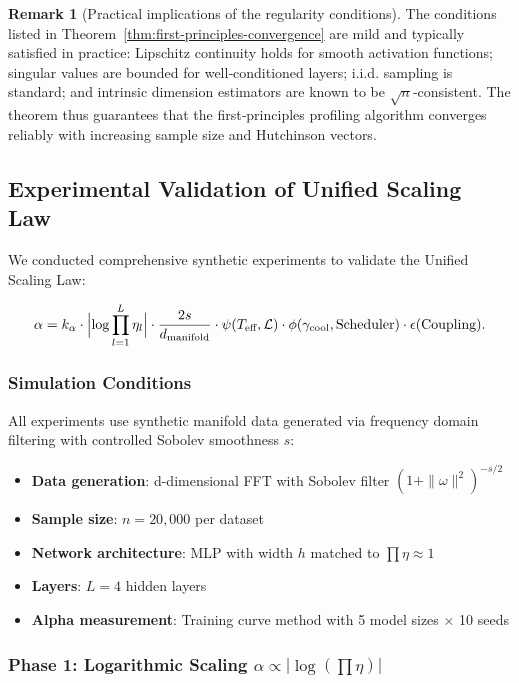 \documentclass[11pt, a4paper]{article}
\theoremstyle{definition}
\newtheorem{remark}{Remark}[section]
\begin{document}
\begin{remark}[Practical implications of the regularity conditions]
The conditions listed in Theorem~\ref{thm:first-principles-convergence} are mild and typically satisfied in practice: Lipschitz continuity holds for smooth activation functions; singular values are bounded for well‑conditioned layers; i.i.d. sampling is standard; and intrinsic dimension estimators are known to be $\sqrt{n}$‑consistent. The theorem thus guarantees that the first‑principles profiling algorithm converges reliably with increasing sample size and Hutchinson vectors.
\end{remark}


\subsection{Experimental Validation of Unified Scaling Law}

We conducted comprehensive synthetic experiments to validate the Unified Scaling Law:

\begin{equation}
\alpha = k_\alpha \cdot \Bigl|\log\prod_{l=1}^{L}\eta_l\Bigr| \cdot \frac{2s}{d_{\text{manifold}}} \cdot \psi(T_{\text{eff}},\mathcal{L}) \cdot \phi(\gamma_{\text{cool}},\text{Scheduler}) \cdot \epsilon(\text{Coupling}).
\end{equation}

\subsubsection{Simulation Conditions}

All experiments use synthetic manifold data generated via frequency domain filtering with controlled Sobolev smoothness $s$:
\begin{itemize}
    \item \textbf{Data generation}: d-dimensional FFT with Sobolev filter $(1 + \|\omega\|^2)^{-s/2}$
    \item \textbf{Sample size}: $n = 20{,}000$ per dataset
    \item \textbf{Network architecture}: MLP with width $h$ matched to $\prod\eta \approx 1$
    \item \textbf{Layers}: $L = 4$ hidden layers
    \item \textbf{Alpha measurement}: Training curve method with 5 model sizes $\times$ 10 seeds
\end{itemize}

\subsubsection{Phase 1: Logarithmic Scaling $\alpha \propto |\log(\prod\eta)|$}
\end{document}
